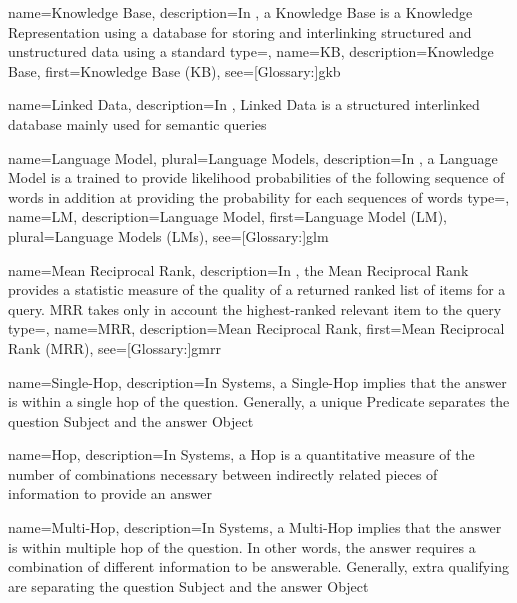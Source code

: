 {
  name={Knowledge Base},
  description={In , a Knowledge Base is a Knowledge Representation using a  database for storing and interlinking structured and unstructured data using a standard}
}
{
  type=\acronymtype,
  name={KB},
  description={Knowledge Base},
  first={Knowledge Base (KB)},
  see=[Glossary:]{gkb}
}


{
  name={Linked Data},
  description={In , Linked Data is a structured interlinked database mainly used for semantic queries}
}

{
  name={Language Model},
  plural={Language Models},
  description={In , a Language Model is a  trained to provide likelihood probabilities of the following sequence of words in addition at providing the probability for each sequences of words}
}
{
  type=\acronymtype,
  name={LM},
  description={Language Model},
  first={Language Model (LM)},
  plural={Language Models (LMs)},
  see=[Glossary:]{glm}
}

{
  name={Mean Reciprocal Rank},
  description={In , the Mean Reciprocal Rank provides a statistic measure of the quality of a returned ranked list of items for a query. MRR takes only in account the highest-ranked relevant item to the query}
}
{
  type=\acronymtype,
  name={MRR},
  description={Mean Reciprocal Rank},
  first={Mean Reciprocal Rank (MRR)},
  see=[Glossary:]{gmrr}
}


{
  name={Single-Hop},
  description={In  Systems, a Single-Hop implies that the answer is within a single \gls{hop} of the question. Generally, a unique Predicate separates the question Subject and the answer Object}
}

{
  name={Hop},
  description={In  Systems, a Hop is a quantitative measure of the number of combinations necessary between indirectly related pieces of information to provide an answer}
}


{
  name={Multi-Hop},
  description={In  Systems, a Multi-Hop implies that the answer is within multiple \gls{hop} of the question. In other words, the answer requires a combination of different information to be answerable. Generally, extra qualifying  are separating the question Subject and the answer Object}
}

